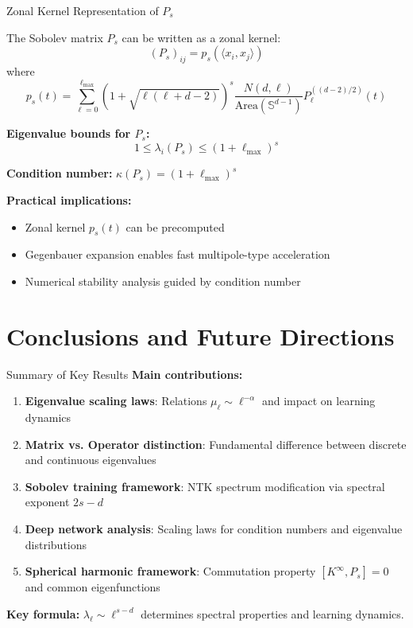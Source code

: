 \documentclass{beamer}
\begin{document}
\begin{frame}{Zonal Kernel Representation of $P_s$}
\begin{theorem}
The Sobolev matrix $P_s$ can be written as a zonal kernel:
\[ (P_s)_{ij} = p_s(\langle x_i, x_j \rangle) \]
where
\[ p_s(t) = \sum_{\ell=0}^{\ell_{\max}} (1 + \sqrt{\ell(\ell + d - 2)})^s \frac{N(d,\ell)}{\text{Area}(\mathbb{S}^{d-1})} P_\ell^{((d-2)/2)}(t) \]
\end{theorem}

\textbf{Eigenvalue bounds for $P_s$:}
\[ 1 \leq \lambda_i(P_s) \leq (1 + \ell_{\max})^s \]

\textbf{Condition number:} $\kappa(P_s) = (1 + \ell_{\max})^s$

\textbf{Practical implications:}
\begin{itemize}
\item Zonal kernel $p_s(t)$ can be precomputed
\item Gegenbauer expansion enables fast multipole-type acceleration
\item Numerical stability analysis guided by condition number
\end{itemize}
\end{frame}

\section{Conclusions and Future Directions}

\begin{frame}{Summary of Key Results}
\textbf{Main contributions:}

\begin{enumerate}
\item \textbf{Eigenvalue scaling laws}: Relations $\mu_\ell \sim \ell^{-\alpha}$ and impact on learning dynamics

\item \textbf{Matrix vs. Operator distinction}: Fundamental difference between discrete and continuous eigenvalues

\item \textbf{Sobolev training framework}: NTK spectrum modification via spectral exponent $2s-d$

\item \textbf{Deep network analysis}: Scaling laws for condition numbers and eigenvalue distributions

\item \textbf{Spherical harmonic framework}: Commutation property $[K^{\infty}, P_s] = 0$ and common eigenfunctions
\end{enumerate}

\textbf{Key formula:} $\lambda_\ell \sim \ell^{s-d}$ determines spectral properties and learning dynamics.
\end{frame}
\end{document}
